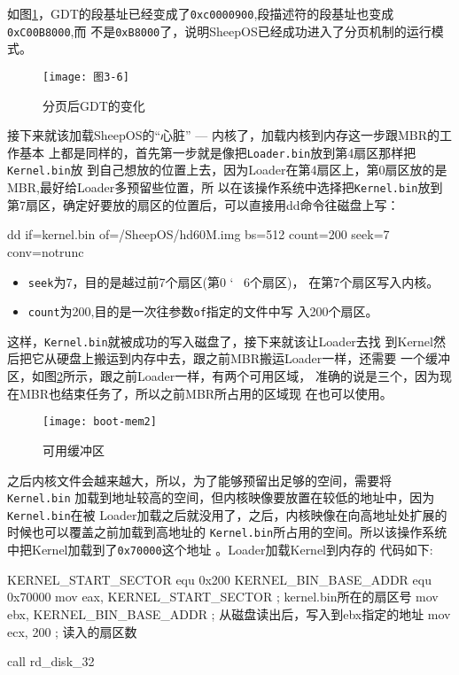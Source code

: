 如图\ref{fig:infogdt}，GDT的段基址已经变成了\texttt{0xc0000900},段描述符的段基址也变成\texttt{0xC00B8000},而
不是\texttt{0xB8000}了，说明SheepOS已经成功进入了分页机制的运行模式。
\begin{figure}[H]
  \centering
  \texttt{[image: 图3-6]}
  \caption{分页后GDT的变化}
  \label{fig:infogdt}
\end{figure}

接下来就该加载SheepOS的“心脏” --- 内核\cite{RL2011}了，加载内核到内存这一步跟MBR的工作基本
上都是同样的，首先第一步就是像把\texttt{Loader.bin}放到第4扇区那样把\texttt{Kernel.bin}放
到自己想放的位置上去，因为Loader在第4扇区上，第0扇区放的是MBR,最好给Loader多预留些位置，所
以在该操作系统中选择把\texttt{Kernel.bin}放到第7扇区，确定好要放的扇区的位置后，可以直接用dd命令往磁盘上写：

\begin{shellcode}
dd if=kernel.bin of=/SheepOS/hd60M.img bs=512 count=200 seek=7 conv=notrunc  
\end{shellcode}

\begin{itemize}
\item \texttt{seek}为7，目的是越过前7个扇区(第0 \char`~{} 6个扇区)，
  在第7个扇区写入内核。
\item \texttt{count}为200,目的是一次往参数\texttt{of}指定的文件中写
  入200个扇区。
\end{itemize}

这样，\texttt{Kernel.bin}就被成功的写入磁盘了，接下来就该让Loader去找
到Kernel然后把它从硬盘上搬运到内存中去，跟之前MBR搬运Loader一样，还需要
一个缓冲区，如图\ref{fig:hc}所示，跟之前Loader一样，有两个可用区域，
准确的说是三个，因为现在MBR也结束任务了，所以之前MBR所占用的区域现
在也可以使用。

\begin{figure}[H]
  \centering
  \texttt{[image: boot-mem2]}
  \caption{可用缓冲区}
  \label{fig:hc}
\end{figure}

之后内核文件会越来越大，所以，为了能够预留出足够的空间，需要将\texttt{Kernel.bin}
加载到地址较高的空间，但内核映像要放置在较低的地址中，因为\texttt{Kernel.bin}在被
Loader加载之后就没用了，之后，内核映像在向高地址处扩展的时候也可以覆盖之前加载到高地址的
\texttt{Kernel.bin}所占用的空间。所以该操作系统中把Kernel加载到了\texttt{0x70000}这个地址\cite{DM2006}
。Loader加载Kernel到内存的
代码如下:

\begin{nasmcode}
   KERNEL_START_SECTOR equ 0x200
   KERNEL_BIN_BASE_ADDR equ 0x70000
   mov eax, KERNEL_START_SECTOR        ; kernel.bin所在的扇区号
   mov ebx, KERNEL_BIN_BASE_ADDR       ; 从磁盘读出后，写入到ebx指定的地址
   mov ecx, 200                ; 读入的扇区数

   call rd_disk_32
\end{nasmcode}

